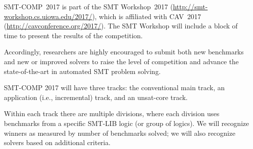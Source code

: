 \documentclass[12pt]{article}
\begin{document}
SMT-COMP~2017 is part of the SMT Workshop~2017
(\url{http://smt-workshop.cs.uiowa.edu/2017/}), which is affiliated
with CAV~2017 (\url{http://cavconference.org/2017/}).  The SMT
Workshop will include a block of time to present the results of the
competition.

Accordingly, researchers are highly encouraged to submit both new
benchmarks and new or improved solvers to raise the level of
competition and advance the state-of-the-art in automated SMT problem
solving.

SMT-COMP 2017 will have three tracks: the conventional main track, an
application (i.e., incremental) track, and an unsat-core track.

Within each track there are multiple divisions, where each division
uses benchmarks from a specific SMT-LIB logic (or group of logics).
We will recognize winners as measured by number of benchmarks solved;
we will also recognize solvers based on additional criteria.
\end{document}
